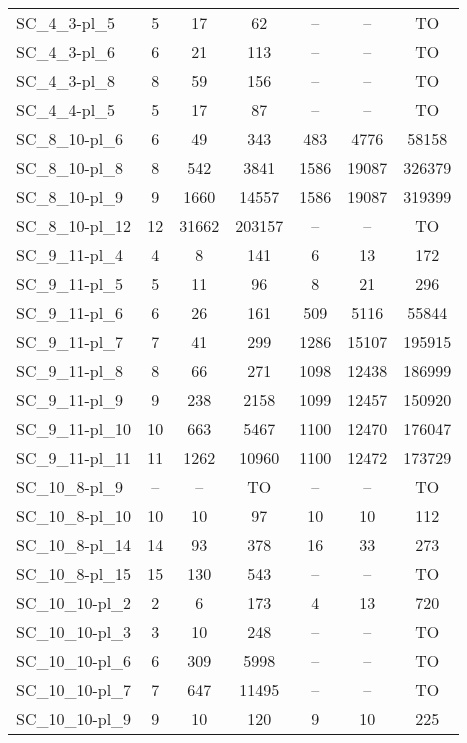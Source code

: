 \documentclass{article}
\newcommand{\unsolvedColumn}{--}
\newcommand{\myTO}{TO}
\begin{document}
\begin{longtable}[!ht]{l|ccc|ccc}
SC\_4\_3-pl\_5 & 5 & 17 & 62 & \unsolvedColumn & \unsolvedColumn & \myTO \\
SC\_4\_3-pl\_6 & 6 & 21 & 113 & \unsolvedColumn & \unsolvedColumn & \myTO \\
SC\_4\_3-pl\_8 & 8 & 59 & 156 & \unsolvedColumn & \unsolvedColumn & \myTO \\
SC\_4\_4-pl\_5 & 5 & 17 & 87 & \unsolvedColumn & \unsolvedColumn & \myTO \\
SC\_8\_10-pl\_6 & 6 & 49 & 343 & 483 & 4776 & 58158 \\
SC\_8\_10-pl\_8 & 8 & 542 & 3841 & 1586 & 19087 & 326379 \\
SC\_8\_10-pl\_9 & 9 & 1660 & 14557 & 1586 & 19087 & 319399 \\
SC\_8\_10-pl\_12 & 12 & 31662 & 203157 & \unsolvedColumn & \unsolvedColumn & \myTO \\
SC\_9\_11-pl\_4 & 4 & 8 & 141 & 6 & 13 & 172 \\
SC\_9\_11-pl\_5 & 5 & 11 & 96 & 8 & 21 & 296 \\
SC\_9\_11-pl\_6 & 6 & 26 & 161 & 509 & 5116 & 55844 \\
SC\_9\_11-pl\_7 & 7 & 41 & 299 & 1286 & 15107 & 195915 \\
SC\_9\_11-pl\_8 & 8 & 66 & 271 & 1098 & 12438 & 186999 \\
SC\_9\_11-pl\_9 & 9 & 238 & 2158 & 1099 & 12457 & 150920 \\
SC\_9\_11-pl\_10 & 10 & 663 & 5467 & 1100 & 12470 & 176047 \\
SC\_9\_11-pl\_11 & 11 & 1262 & 10960 & 1100 & 12472 & 173729 \\
SC\_10\_8-pl\_9 & \unsolvedColumn & \unsolvedColumn & \myTO & \unsolvedColumn & \unsolvedColumn & \myTO \\
SC\_10\_8-pl\_10 & 10 & 10 & 97 & 10 & 10 & 112 \\
SC\_10\_8-pl\_14 & 14 & 93 & 378 & 16 & 33 & 273 \\
SC\_10\_8-pl\_15 & 15 & 130 & 543 & \unsolvedColumn & \unsolvedColumn & \myTO \\
SC\_10\_10-pl\_2 & 2 & 6 & 173 & 4 & 13 & 720 \\
SC\_10\_10-pl\_3 & 3 & 10 & 248 & \unsolvedColumn & \unsolvedColumn & \myTO \\
SC\_10\_10-pl\_6 & 6 & 309 & 5998 & \unsolvedColumn & \unsolvedColumn & \myTO \\
SC\_10\_10-pl\_7 & 7 & 647 & 11495 & \unsolvedColumn & \unsolvedColumn & \myTO \\
SC\_10\_10-pl\_9 & 9 & 10 & 120 & 9 & 10 & 225 \\

\end{longtable}
\end{document}
